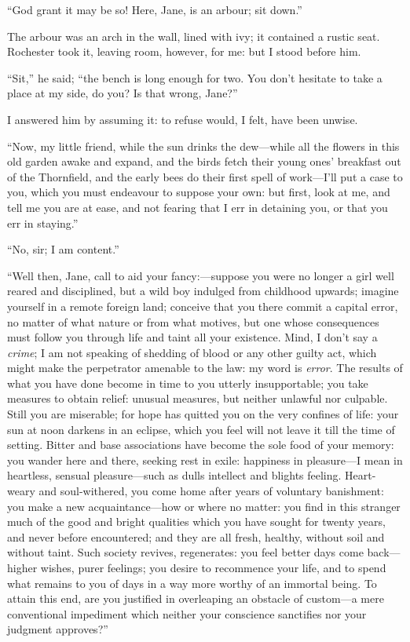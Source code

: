 \enquote{God grant it may be so! Here, Jane, is an arbour; sit down.}

The arbour was an arch in the wall, lined with ivy; it contained a
rustic seat. \Mr{} Rochester took it, leaving room, however, for me: but
I stood before him.

\enquote{Sit,} he said; \enquote{the bench is long enough for two. You
	don't hesitate to take a place at my side, do you? Is that wrong,
	Jane?}

I answered him by assuming it: to refuse would, I felt, have been
unwise.

\enquote{Now, my little friend, while the sun drinks the dew---while all
	the flowers in this old garden awake and expand, and the birds fetch
	their young ones' breakfast out of the Thornfield, and the early bees do
	their first spell of work---I'll put a case to you, which you must
	endeavour to suppose your own: but first, look at me, and tell me you
	are at ease, and not fearing that I err in detaining you, or that you
	err in staying.}

\enquote{No, sir; I am content.}

\enquote{Well then, Jane, call to aid your fancy:---suppose you were no longer
	a girl well reared and disciplined, but a wild boy indulged from
	childhood upwards; imagine yourself in a remote foreign land; conceive
	that you there commit a capital error, no matter of what nature or from
	what motives, but one whose consequences must follow you through life
	and taint all your existence. Mind, I don't say a \emph{crime}; I am
	not speaking of shedding of blood or any other guilty act, which might
	make the perpetrator amenable to the law: my word is \emph{error}. The
	results of what you have done become in time to you utterly
	insupportable; you take measures to obtain relief: unusual measures, but
	neither unlawful nor culpable. Still you are miserable; for hope has
	quitted you on the very confines of life: your sun at noon darkens in an
	eclipse, which you feel will not leave it till the time of setting.
	Bitter and base associations have become the sole food of your memory:
	you wander here and there, seeking rest in exile: happiness in
	pleasure---I mean in heartless, sensual pleasure---such as dulls
	intellect and blights feeling. Heart-weary and soul-withered, you come
	home after years of voluntary banishment: you make a new
	acquaintance---how or where no matter: you find in this stranger much of
	the good and bright qualities which you have sought for twenty years,
	and never before encountered; and they are all fresh, healthy, without
	soil and without taint. Such society revives, regenerates: you feel
	better days come back---higher wishes, purer feelings; you desire to
	recommence your life, and to spend what remains to you of days in a way
	more worthy of an immortal being. To attain this end, are you justified
	in overleaping an obstacle of custom---a mere conventional impediment
	which neither your conscience sanctifies nor your judgment approves?}

